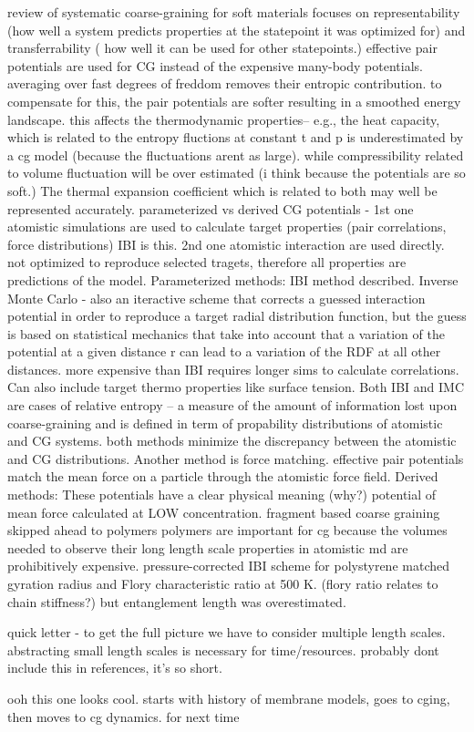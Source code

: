 \documentclass{article}
\begin{document}
\cite{Brini2013}
review of systematic coarse-graining for soft materials
focuses on representability (how well a system predicts properties at the statepoint it was optimized for) and transferrability ( how well it can be used for other statepoints.)
effective pair potentials are used for CG instead of the expensive many-body potentials. averaging over fast degrees of freddom removes their entropic contribution. to compensate for this, the pair potentials are softer resulting in a smoothed energy landscape. this affects the thermodynamic properties-- e.g., the heat capacity, which is related to the entropy fluctions at constant t and p is underestimated by a cg model (because the fluctuations arent as large). while compressibility related to volume fluctuation will be over estimated (i think because the potentials are so soft.) The thermal expansion coefficient which is related to both may well be represented accurately.
parameterized vs derived CG potentials - 1st one atomistic simulations are used to calculate target properties (pair correlations, force distributions) IBI is this. 2nd one atomistic interaction are used directly. not optimized to reproduce selected tragets, therefore all properties are predictions of the model.
Parameterized methods: IBI method described. 
Inverse Monte Carlo - also an iteractive scheme that corrects a guessed interaction potential in order to reproduce a target radial distribution function, but the guess is based on statistical mechanics that take into account that a variation of the potential at a given distance r can lead to a variation of the RDF at all other distances. more expensive than IBI requires longer sims to calculate correlations. Can also include target thermo properties like surface tension.
Both IBI and IMC are cases of relative entropy -- a measure of the amount of information lost upon coarse-graining and is defined in term of propability distributions of atomistic and CG systems. both methods minimize the discrepancy between the atomistic and CG distributions.
Another method is force matching. effective pair potentials match the mean force on a particle through the atomistic force field.
Derived methods: These potentials have a clear physical meaning (why?) potential of mean force calculated at LOW concentration. fragment based coarse graining
skipped ahead to polymers
polymers are important for cg because the volumes needed to observe their long length scale properties in atomistic md are prohibitively expensive. pressure-corrected IBI scheme for polystyrene matched gyration radius and Flory characteristic ratio at 500 K. (flory ratio relates to chain stiffness?) but entanglement length was overestimated.

\cite{Murtola2009a}
quick letter - to get the full picture we have to consider multiple length scales. abstracting small length scales is necessary for time/resources. probably dont include this in references, it's so short.

\cite{Peter2009d}
ooh this one looks cool. starts with history of membrane models, goes to cging, then moves to cg dynamics. for next time

\cite{Kim2006}
\cite{Lee2011}
\cite{Huang2010}
\cite{Jankowski2013}
\cite{Marsh2014}



\end{document}
